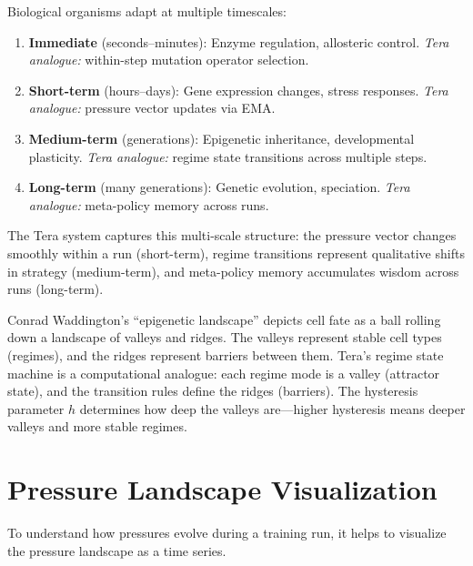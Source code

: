 Biological organisms adapt at multiple timescales:
\begin{enumerate}[leftmargin=1.8em]
  \item \textbf{Immediate} (seconds--minutes): Enzyme regulation, allosteric control. \emph{Tera analogue:} within-step mutation operator selection.
  \item \textbf{Short-term} (hours--days): Gene expression changes, stress responses. \emph{Tera analogue:} pressure vector updates via EMA.
  \item \textbf{Medium-term} (generations): Epigenetic inheritance, developmental plasticity. \emph{Tera analogue:} regime state transitions across multiple steps.
  \item \textbf{Long-term} (many generations): Genetic evolution, speciation. \emph{Tera analogue:} meta-policy memory across runs.
\end{enumerate}

The Tera system captures this multi-scale structure: the pressure vector changes smoothly within a run (short-term), regime transitions represent qualitative shifts in strategy (medium-term), and meta-policy memory accumulates wisdom across runs (long-term).

\begin{bioinsight}
Conrad Waddington's ``epigenetic landscape'' depicts cell fate as a ball rolling down a landscape of valleys and ridges. The valleys represent stable cell types (regimes), and the ridges represent barriers between them. Tera's regime state machine is a computational analogue: each regime mode is a valley (attractor state), and the transition rules define the ridges (barriers). The hysteresis parameter $h$ determines how deep the valleys are---higher hysteresis means deeper valleys and more stable regimes.
\end{bioinsight}

\section{Pressure Landscape Visualization}
\label{sec:pressure-landscape}

To understand how pressures evolve during a training run, it helps to visualize the pressure landscape as a time series.

